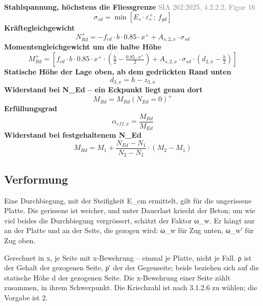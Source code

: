 \documentclass[11pt,a4paper]{article}
\newcommand{\normref}[1]{{\small\textcolor{gray}{#1}}}
\begin{document}
\noindent\textbf{Stahlspannung, höchstens die Fliessgrenze} \hfill \normref{SIA 262:2025, 4.2.2.2, Figur 16}
\begin{equation*}
\sigma_{sd} = \min\left[E_s \cdot \varepsilon_s^{+};\ f_{yd}\right]
\end{equation*}
\noindent\textbf{Kräftegleichgewicht}
\begin{equation*}
N_{Rd}^{+} = -f_{cd} \cdot b \cdot 0.85 \cdot x^{+} + A_{s,2,x} \cdot \sigma_{sd}
\end{equation*}
\noindent\textbf{Momentengleichgewicht um die halbe Höhe}
\begin{equation*}
M_{Rd}^{+} = \left[f_{cd} \cdot b \cdot 0.85 \cdot x^{+} \cdot \left(\tfrac{h}{2} - \tfrac{0.85 \cdot x^{+}}{2}\right) + A_{s,2,x} \cdot \sigma_{sd} \cdot \left(d_{2,x} - \tfrac{h}{2}\right)\right]
\end{equation*}
\noindent\textbf{Statische Höhe der Lage oben, ab dem gedrückten Rand unten}
\begin{equation*}
d_{3,x} = h - z_{3,x}
\end{equation*}
\noindent\textbf{Widerstand bei N\_Ed – ein Eckpunkt liegt genau dort}
\begin{equation*}
M_{Rd} = M_{Rd}(N_{Ed}=0)^{+}
\end{equation*}
\noindent\textbf{Erfüllungsgrad}
\begin{equation*}
\alpha_{eff,x} = \frac{M_{Rd}}{M_{Ed}}
\end{equation*}
\noindent\textbf{Widerstand bei festgehaltenem N\_Ed}
\begin{equation*}
M_{Rd} = M_1 + \frac{N_{Ed} - N_1}{N_2 - N_1} \cdot \left(M_2 - M_1\right)
\end{equation*}
\subsection{Verformung}
Eine Durchbiegung, mit der Steifigkeit E\_cm ermittelt, gilt für die ungerissene Platte. Die gerissene ist weicher, und unter Dauerlast kriecht der Beton; um wie viel beides die Durchbiegung vergrössert, schätzt der Faktor ω\_w. Er hängt nur an der Platte und an der Seite, die gezogen wird: ω\_w für Zug unten, ω\_w′ für Zug oben.

Gerechnet in x, je Seite mit x-Bewehrung – einmal je Platte, nicht je Fall. ρ ist der Gehalt der gezogenen Seite, ρ′ der der Gegenseite; beide beziehen sich auf die statische Höhe d der gezogenen Seite. Die x-Bewehrung einer Seite zählt zusammen, in ihrem Schwerpunkt. Die Kriechzahl ist nach 3.1.2.6 zu wählen; die Vorgabe ist 2.
\end{document}
